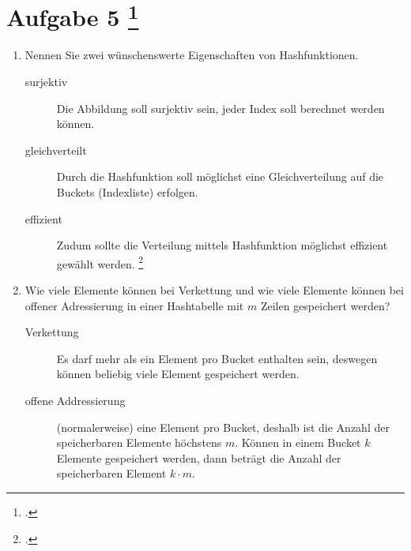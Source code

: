 \documentclass{lehramt-informatik-aufgabe}
\begin{document}
\section{Aufgabe 5
\footcite{66115:2021:03}}
\begin{enumerate}


\item Nennen Sie zwei wünschenswerte Eigenschaften von Hashfunktionen.

\begin{liAntwort}
\begin{description}
\item[surjektiv]

Die Abbildung soll surjektiv sein, \dh jeder Index soll berechnet werden
können.

\item[gleichverteilt]

Durch die Hashfunktion soll möglichst eine Gleichverteilung auf die
Buckets (Indexliste) erfolgen.

\item[effizient]

Zudum sollte die Verteilung mittels Hashfunktion möglichst effizient
gewählt werden.
\footcite{wiki:hashfunktion}
\end{description}
\end{liAntwort}


\item Wie viele Elemente können bei Verkettung und wie viele Elemente
können bei offener Adressierung in einer Hashtabelle mit $m$ Zeilen
gespeichert werden?

\begin{liAntwort}
\begin{description}
\item[Verkettung]

Es darf mehr als ein Element pro Bucket enthalten sein, deswegen können
beliebig viele Element gespeichert werden.

\item[offene Addressierung]

(normalerweise) eine Element pro Bucket, deshalb ist die Anzahl der
speicherbaren Elemente höchstens $m$. Können in einem Bucket $k$
Elemente gespeichert werden, dann beträgt die Anzahl der speicherbaren
Element $k \cdot m$.
\end{description}
\end{liAntwort}


\end{enumerate}
\end{document}
